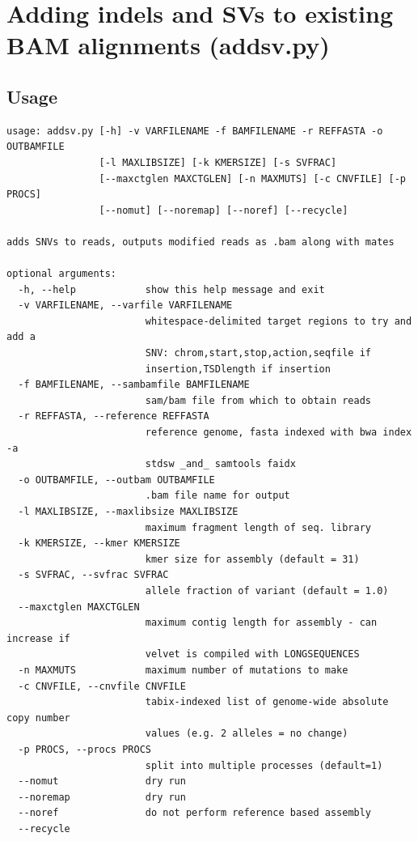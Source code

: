 \documentclass[letterpaper,11pt]{article}
\begin{document}
\section{Adding indels and SVs to existing BAM alignments (addsv.py)}

\subsection{Usage}
\begin{verbatim}
usage: addsv.py [-h] -v VARFILENAME -f BAMFILENAME -r REFFASTA -o OUTBAMFILE
                [-l MAXLIBSIZE] [-k KMERSIZE] [-s SVFRAC]
                [--maxctglen MAXCTGLEN] [-n MAXMUTS] [-c CNVFILE] [-p PROCS]
                [--nomut] [--noremap] [--noref] [--recycle]

adds SNVs to reads, outputs modified reads as .bam along with mates

optional arguments:
  -h, --help            show this help message and exit
  -v VARFILENAME, --varfile VARFILENAME
                        whitespace-delimited target regions to try and add a
                        SNV: chrom,start,stop,action,seqfile if
                        insertion,TSDlength if insertion
  -f BAMFILENAME, --sambamfile BAMFILENAME
                        sam/bam file from which to obtain reads
  -r REFFASTA, --reference REFFASTA
                        reference genome, fasta indexed with bwa index -a
                        stdsw _and_ samtools faidx
  -o OUTBAMFILE, --outbam OUTBAMFILE
                        .bam file name for output
  -l MAXLIBSIZE, --maxlibsize MAXLIBSIZE
                        maximum fragment length of seq. library
  -k KMERSIZE, --kmer KMERSIZE
                        kmer size for assembly (default = 31)
  -s SVFRAC, --svfrac SVFRAC
                        allele fraction of variant (default = 1.0)
  --maxctglen MAXCTGLEN
                        maximum contig length for assembly - can increase if
                        velvet is compiled with LONGSEQUENCES
  -n MAXMUTS            maximum number of mutations to make
  -c CNVFILE, --cnvfile CNVFILE
                        tabix-indexed list of genome-wide absolute copy number
                        values (e.g. 2 alleles = no change)
  -p PROCS, --procs PROCS
                        split into multiple processes (default=1)
  --nomut               dry run
  --noremap             dry run
  --noref               do not perform reference based assembly
  --recycle

\end{verbatim}
\end{document}
